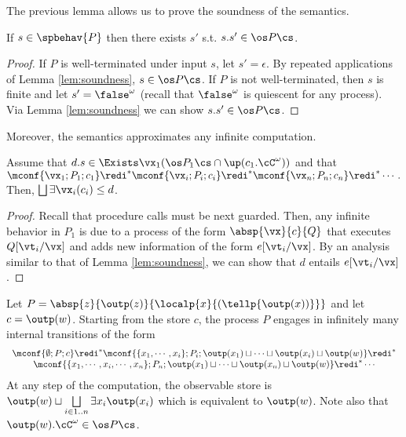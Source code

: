 \documentclass{tlp}
\begin{document}
The previous lemma allows us to prove the soundness of the semantics. 
\begin{theorem}[Soundness]\label{theo:sound}
If $s\in \spbehav{P}$ then there exists $s'$ s.t. $s.s' \in \os P\cs$. 
\end{theorem}
\begin{proof}
If $P$ is well-terminated under input $s$, let $s'=\epsilon$. By repeated applications of Lemma \ref{lem:soundness}, $s \in \os P\cs$. If $P$ is not well-terminated, then $s$ is finite and let $s'=\false^\omega$
(recall that $\false^\omega$ is quiescent for any process). Via Lemma \ref{lem:soundness} we can show $s.s' \in \os P\cs$.
\end{proof}

Moreover, the semantics approximates any infinite computation.
\begin{corollary}
       Assume that $d.s \in \Exists \vx_1 (\os P_1\cs \cap \up(c_1.\cC^\omega))$ and  that $\mconf{\vx_1;P_1;c_1} \redi^* \mconf{\vx_i;P_i;c_i} \redi^*  \mconf{\vx_n;P_n;c_n} \redi^* \cdots.$ Then,  $\bigsqcup  \exists \vx_i(c_i) \leq d$. 
\end{corollary}
\begin{proof}
 Recall that procedure calls must be next guarded. Then, any infinite behavior in $P_1$ is due to a process of the form $\absp{\vx}{c}{Q}$
that executes $Q[\vt_i/\vx]$ and adds new information of the form $e[\vt_i/\vx]$. By an analysis  similar to that of Lemma \ref{lem:soundness}, we can show that $d$ entails $e[\vt_i/\vx]$. 
\end{proof}




\begin{example}
Let  $P=\absp{z}{\outp(z)}{\localp{x}{(\tellp{\outp(x))}}}$ and 
let $c=\outp(w)$. Starting from the store $c$, the process $P$   engages in infinitely many internal transitions of the form 
\[
\begin{array}{c}
\mconf{\emptyset;P ;c} \redi^* \mconf{\{x_1,\cdots, x_i\}; P_i; \outp(x_1)\sqcup \cdots \sqcup \outp(x_i)\sqcup \outp(w)} \redi^* \\
\mconf{\{x_1,\cdots,x_i,\cdots, x_n\}; P_n; \outp(x_1)\sqcup \cdots \sqcup \outp(x_n)\sqcup \outp(w)} \redi^* \cdots
\end{array}
\]
At any step of the computation, the observable store is $\outp(w) \sqcup \bigsqcup\limits_{i\in 1..n}\exists x_i  \outp(x_i) $ which is equivalent to $\outp(w)$. Note also that $\outp(w).\cC^\omega \in \os P \cs$. 
\end{example}
\end{document}
